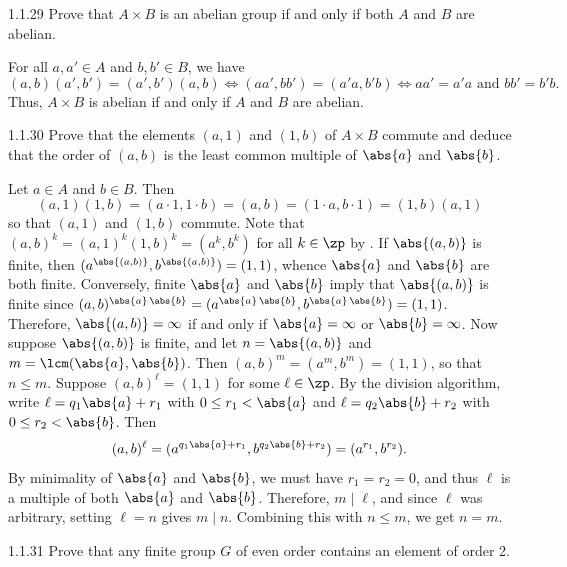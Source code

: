 \begin{exercise}{1.1.29}
    Prove that $A \times B$ is an abelian group if and only if both $A$ and $B$ are abelian.
\end{exercise}

\begin{sol}
    For all $a, a' \in A$ and $b, b' \in B$, we have
    \[
        (a, b)(a', b') = (a', b')(a, b) \iff (aa', bb') = (a'a, b'b) \iff aa' = a'a \text{ and } bb' = b'b.
    \]
    Thus, $A \times B$ is abelian if and only if $A$ and $B$ are abelian.
\end{sol}

\begin{exercise}{1.1.30}
    Prove that the elements $(a, 1)$ and $(1, b)$ of $A \times B$ commute and deduce that the order of $(a, b)$ is the least common multiple of $\abs{a}$ and $\abs{b}$.
\end{exercise}

\begin{sol}
    Let $a \in A$ and $b \in B$.
	Then
    \[
    	(a, 1)(1, b) = (a \cdot 1, 1 \cdot b) = (a, b) = (1 \cdot a, b \cdot 1) = (1, b)(a, 1)
    \]
    so that $(a, 1)$ and $(1, b)$ commute.
	Note that $(a, b)^k = (a, 1)^k (1, b)^k = (a^k, b^k)$ for all $k \in \zp$ by .
    If $\abs{(a, b)}$ is finite, then $(a^{\abs{(a, b)}}, b^{\abs{(a, b)}}) = (1, 1)$, whence $\abs{a}$ and $\abs{b}$ are both finite.
    Conversely, finite $\abs{a}$ and $\abs{b}$ imply that $\abs{(a, b)}$ is finite since $(a, b)^{\abs{a}\,\abs{b}} = (a^{\abs{a}\,\abs{b}}, b^{\abs{a}\,\abs{b}}) = (1, 1)$.
    Therefore, $\abs{(a, b)} = \infty$ if and only if $\abs{a} = \infty$ or $\abs{b} = \infty$.
    Now suppose $\abs{(a, b)}$ is finite, and let $n = \abs{(a, b)}$ and $m = \lcm(\abs{a}, \abs{b})$.
    Then $(a, b)^m = (a^m, b^m) = (1, 1)$, so that $n \leq m$.
    Suppose $(a, b)^\ell = (1, 1)$ for some $\ell \in \zp$.
    By the division algorithm, write $\ell = q_1 \abs{a} + r_1$ with $0 \leq r_1 < \abs{a}$ and $\ell = q_2 \abs{b} + r_2$ with $0 \leq r_2 < \abs{b}$.
    Then
    \[
        (a, b)^\ell = (a^{q_1 \abs{a} + r_1}, b^{q_2 \abs{b} + r_2}) = (a^{r_1}, b^{r_2}).
    \]
    By minimality of $\abs{a}$ and $\abs{b}$, we must have $r_1 = r_2 = 0$, and thus $\ell$ is a multiple of both $\abs{a}$ and $\abs{b}$.
    Therefore, $m \mid \ell$, and since $\ell$ was arbitrary, setting $\ell = n$ gives $m \mid n$.
    Combining this with $n \leq m$, we get $n = m$.
\end{sol}

\begin{exercise}{1.1.31}
    Prove that any finite group $G$ of even order contains an element of order 2. 
\end{exercise}

